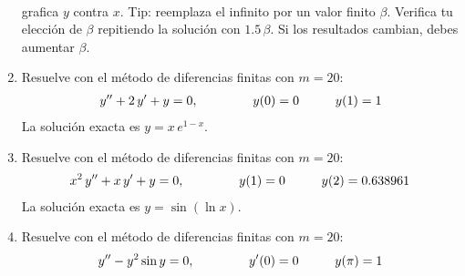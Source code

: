 \begin{enumerate}
\begin{align*}
\end{align*}
grafica $y$ contra $x$. Tip: reemplaza el infinito por un valor finito $\beta$. Verifica tu elección de $\beta$ repitiendo la solución con $1.5 \, \beta$. Si los resultados cambian, debes aumentar $\beta$.
\item Resuelve con el método de diferencias finitas con $m = 20$:
\begin{align*}
{y}^{\prime \prime} + 2 \, {y}^{\prime} + y = 0, \hspace{1.5cm} y (0) = 0 \hspace{1cm} y (1) = 1
\end{align*}
La solución exacta es $y = x \, e^{1-x}$.
\item Resuelve con el método de diferencias finitas con $m = 20$:
\begin{align*}
x^{2} \, {y}^{\prime \prime} + x \, {y}^{\prime} + y = 0, \hspace{1.5cm} y (1) = 0 \hspace{1cm} y (2) = 0.638961
\end{align*}
La solución exacta es $y = \sin(\ln x)$.
\item Resuelve con el método de diferencias finitas con $m = 20$:
\begin{align*}
{y}^{\prime \prime} - y^{2} \sin y = 0, \hspace{1.5cm} {y}^{\prime} (0) = 0 \hspace{1cm} y (\pi) = 1
\end{align*}
\end{enumerate}


